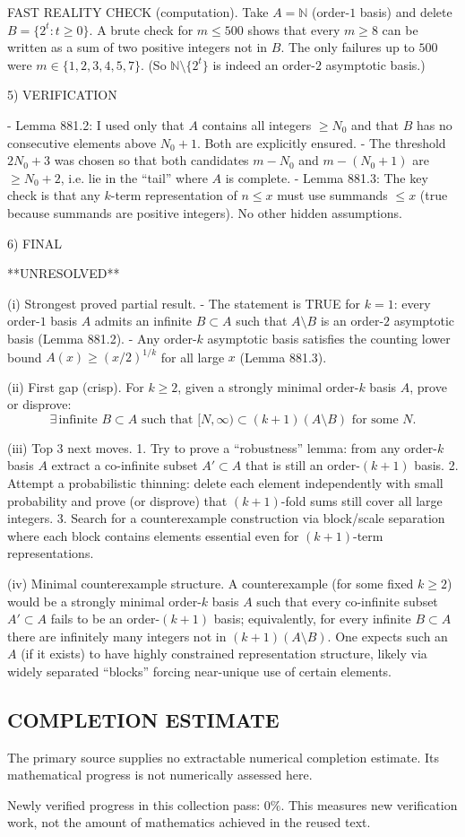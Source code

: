 FAST REALITY CHECK (computation).
Take $A=\mathbb N$ (order-$1$ basis) and delete $B=\{2^t:t\ge 0\}$.
A brute check for $m\le 500$ shows that every $m\ge 8$ can be written as a sum of two positive integers not in $B$.
The only failures up to $500$ were $m\in\{1,2,3,4,5,7\}$.
(So $\mathbb N\setminus\{2^t\}$ is indeed an order-$2$ asymptotic basis.)

5) VERIFICATION

- Lemma 881.2: I used only that $A$ contains all integers $\ge N_0$ and that $B$ has no consecutive elements above $N_0+1$. Both are explicitly ensured.
- The threshold $2N_0+3$ was chosen so that both candidates $m-N_0$ and $m-(N_0+1)$ are $\ge N_0+2$, i.e. lie in the “tail” where $A$ is complete.
- Lemma 881.3: The key check is that any $k$-term representation of $n\le x$ must use summands $\le x$ (true because summands are positive integers). No other hidden assumptions.

6) FINAL

**UNRESOLVED**

(i) Strongest proved partial result.
- The statement is TRUE for $k=1$: every order-$1$ basis $A$ admits an infinite $B\subset A$ such that $A\setminus B$ is an order-$2$ asymptotic basis (Lemma 881.2).
- Any order-$k$ asymptotic basis satisfies the counting lower bound $A(x)\ge (x/2)^{1/k}$ for all large $x$ (Lemma 881.3).

(ii) First gap (crisp).
For $k\ge 2$, given a strongly minimal order-$k$ basis $A$, prove or disprove:
\[\exists\,\text{infinite }B\subset A\text{ such that }[N,\infty)\subset (k+1)(A\setminus B)\text{ for some }N.\]

(iii) Top 3 next moves.
1. Try to prove a “robustness” lemma: from any order-$k$ basis $A$ extract a co-infinite subset $A'\subset A$ that is still an order-$(k+1)$ basis.
2. Attempt a probabilistic thinning: delete each element independently with small probability and prove (or disprove) that $(k+1)$-fold sums still cover all large integers.
3. Search for a counterexample construction via block/scale separation where each block contains elements essential even for $(k+1)$-term representations.

(iv) Minimal counterexample structure.
A counterexample (for some fixed $k\ge 2$) would be a strongly minimal order-$k$ basis $A$ such that every co-infinite subset $A'\subset A$ fails to be an order-$(k+1)$ basis; equivalently, for every infinite $B\subset A$ there are infinitely many integers not in $(k+1)(A\setminus B)$. One expects such an $A$ (if it exists) to have highly constrained representation structure, likely via widely separated “blocks” forcing near-unique use of certain elements.




\subsection*{COMPLETION ESTIMATE}
The primary source supplies no extractable numerical completion estimate. Its mathematical progress is not numerically assessed here.

Newly verified progress in this collection pass: $0\%$. This measures new verification work, not the amount of mathematics achieved in the reused text.
